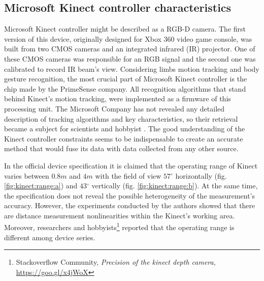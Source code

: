 \documentclass[sensors,article,submit,moreauthors,pdftex,10pt,a4paper]{mdpi}
\newcommand{\degree}{\ensuremath{{}^{\circ}}\xspace}
\begin{document}

\subsection{Microsoft Kinect controller characteristics}
Microsoft Kinect controller might be described as a RGB-D camera. The first version of this device, originally designed for Xbox 360 video game console, was built from two CMOS cameras and an integrated infrared (IR) projector. One of these CMOS cameras was responsible for an RGB signal and the second one was calibrated to record IR beam’s view. Considering limbs motion tracking and body gesture recognition, the most crucial part of Microsoft Kinect controller is the chip made by the PrimeSense company. All recognition algorithms that stand behind Kinect’s motion tracking, were implemented as a firmware of this processing unit. 
The Microsoft Company has not revealed any detailed description of tracking algorithms and key characteristics, so their retrieval became a subject for scientists and hobbyist \cite{Skalski2015,Gonzalez-Jorge2013,Khoshelham2012}. The good understanding of the Kinect controller constraints seems to be indispensable to create an accurate method that would fuse its data with data collected from any other source. 

In the official device specification it is claimed that the operating range of Kinect varies between $0.8m$ and $4m$ with the field of view $57\degree$ horizontally (fig. \ref{fig:kinect:range:a}) and $43\degree$ vertically (fig. \ref{fig:kinect:range:b}). At the same time, the specification does not reveal the possible heterogeneity of the measurement's accuracy. However, the experiments conducted by the authors showed that there are distance measurement nonlinearities within the Kinect’s working area. Moreover, researchers \cite{DiFilippo2015} and hobbyists\footnote{Stackoverflow Community, \textit{Precision of the kinect depth camera}, \url{https://goo.gl/x4jWoX}} reported that the operating range is different among device series.  
\end{document}
